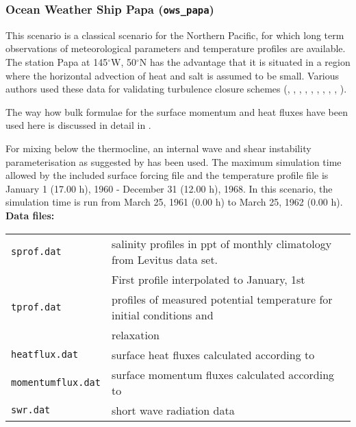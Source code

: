 %

\subsubsection{Ocean Weather Ship Papa ({\tt ows\_papa})}\label{ows_papa}

This scenario is a classical scenario 
for the Northern Pacific, for which
long term observations of meteorological parameters
and temperature profiles are available. The station Papa at 145$^{\circ}$W,
50$^{\circ}$N has the advantage
that it is situated in a region where the horizontal advection of
heat and salt is assumed to be small. Various authors used these data for
validating turbulence closure schemes (\cite{Denman73}, \cite{Martin85},
\cite{Gasparetal90}, \cite{Largeetal94}, \cite{KanthaClayson94},
\cite{dAlessioetal98}, \cite{Burchardetal99}, \cite{Villarreal2000},
\cite{AxellLiungman2001}, \cite{BurchardBolding2001}).

The way how bulk formulae for the surface momentum and heat fluxes
have been used here is discussed in detail in \cite{Burchardetal99}.

For mixing below the thermocline, an 
internal wave and shear instability
parameterisation 
as suggested by \cite{Largeetal94} has been used.
The maximum simulation time allowed by
the included surface forcing file and the temperature profile file
is January 1 (17.00 h), 1960 - December 31 (12.00 h), 1968.
In this scenario, the simulation time is run from
March 25, 1961 (0.00 h) to March 25, 1962 (0.00 h).
\\

{\bf Data files:}

\begin{tabular}{ll}
{\tt sprof.dat} &   salinity profiles in ppt of monthly climatology from 
Levitus data set. \\ & First profile interpolated to January, 1st \\ 
{\tt tprof.dat} & profiles of measured potential temperature for 
initial conditions and \\ & relaxation \\    
{\tt heatflux.dat} & surface heat fluxes calculated according to
\cite{Kondo75} \\
{\tt momentumflux.dat} & surface momentum fluxes calculated according to \cite{Kondo75} \\
{\tt swr.dat} & short wave radiation data \\
\end{tabular}
\\

